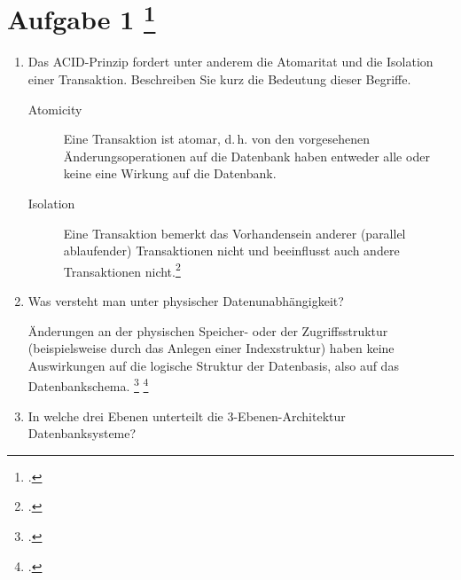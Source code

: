 \documentclass{lehramt-informatik-aufgabe}
\begin{document}
\let\m=\liAttributMenge
\let\fa=\liFunktionaleAbhaengigkeit

\section{Aufgabe 1
\footcite{66116:2019:03}}

\begin{enumerate}


\item Das ACID-Prinzip fordert unter anderem die Atomaritat und die
Isolation einer Transaktion. Beschreiben Sie kurz die Bedeutung dieser
Begriffe.

\begin{liAntwort}
\begin{description}
\item[Atomicity]

Eine Transaktion ist atomar, d.\,h. von den vorgesehenen
Änderungsoperationen auf die Datenbank haben entweder alle oder keine
eine Wirkung auf die Datenbank.

\item[Isolation]

Eine Transaktion bemerkt das Vorhandensein anderer (parallel
ablaufender) Transaktionen nicht und beeinflusst auch andere
Transaktionen nicht.\footcite[Kapitel 9.5 „Eigenschaften von Transaktionen“, Seite 305]{kemper}
\end{description}
\end{liAntwort}


\item Was versteht man unter physischer Datenunabhängigkeit?

\begin{liAntwort}
Änderungen an der physischen Speicher- oder der Zugriffsstruktur
(beispielsweise durch das Anlegen einer Indexstruktur) haben keine
Auswirkungen auf die logische Struktur der Datenbasis, also auf das
Datenbankschema.
\footcite[Seite 20]{db:fs:3}
\footcite[Kapitel 1.3 Datenunabhängigkeit Seite 24]{kemper}
\end{liAntwort}


\item In welche drei Ebenen unterteilt die 3-Ebenen-Architektur
Datenbanksysteme?

\begin{liAntwort}


\end{liAntwort}
\end{enumerate}
\end{document}
